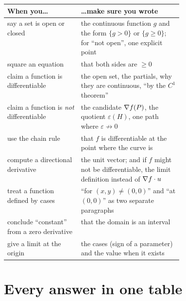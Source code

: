 \begin{center}\small
\begin{tabularx}{\linewidth}{@{}>{\raggedright\arraybackslash}p{0.42\linewidth}Y@{}}\toprule
\textsf{\textbf{\color{tealDD}When you\ldots}} & \textsf{\textbf{\color{tealDD}\ldots make sure you wrote}}\\ \midrule
say a set is open or closed & the continuous function $g$ and the form $\{g>0\}$ or $\{g\ge0\}$; for ``not open'', one explicit point\\
square an equation & that both sides are $\ge0$\\
claim a function is differentiable & the open set, the partials, why they are continuous, ``by the $C^1$ theorem''\\
claim a function is \emph{not} differentiable & the candidate $\nabla f(P)$, the quotient $\varepsilon(H)$, one path where $\varepsilon\not\to0$\\
use the chain rule & that $f$ is differentiable at the point where the curve is\\
compute a directional derivative & the unit vector; and if $f$ might not be differentiable, the limit definition instead of $\nabla f\cdot u$\\
treat a function defined by cases & ``for $(x,y)\ne(0,0)$'' and ``at $(0,0)$'' as two separate paragraphs\\
conclude ``constant'' from a zero derivative & that the domain is an interval\\
give a limit at the origin & the cases (sign of a parameter) and the value when it exists\\ \bottomrule
\end{tabularx}
\end{center}

\section{Every answer in one table}

